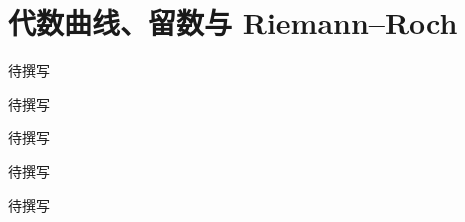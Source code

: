 
% 
% 

\chapter{代数曲线、留数与 Riemann–Roch}
\label{g5:ch:23}

\begin{chapterabstract}
待撰写
\end{chapterabstract}

\begin{learninggoals}
待撰写
\end{learninggoals}

待撰写







\begin{chaptersummary}
待撰写
\end{chaptersummary}

\BookExercises
待撰写
